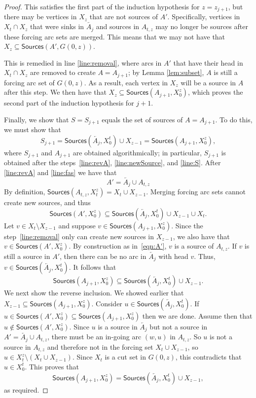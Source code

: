 \documentclass[12pt]{amsart}
\theoremstyle{plain}
\theoremstyle{definition}
\renewcommand{\subset}{\subseteq}
\newcommand{\rev}[1]{\overleftarrow{#1}}
\newcommand{\sources}{\mathsf{Sources}}
\newcommand{\fas}{\mathsf{FAS}}
\begin{document}
\begin{proof}
This satisfies the first part of the induction hypothesis for $z=z_{j+1}$, but there may be vertices in $X_{z}$ that are not sources of $A'$. Specifically, vertices in $X_t\cap X_z$ that were sinks in $\overleftarrow{A_j}$ and sources in $A_{t,z}$ may no longer be sources after these forcing arc sets are merged. This means that we may not have that $X_z\subset \sources(A', G(0,z))$.

This is remedied in line \ref{line:removal}, where arcs in $A'$ that have their head in $X_t\cap X_{z}$ are removed to create $A=A_{j+1}$; by Lemma \ref{lem:subset}, $A$ is still a forcing arc set of $G(0,z)$. As a result, each vertex in $X_{z}$ will be a source in $A$ after this step. We then have that $X_z\subset \sources(A_{j+1},X_0^z)$, which proves the second part of the induction hypothesis for $j+1$.



Finally, we show that $S=S_{j+1}$ equals the set of sources of $A=A_{j+1}$. To do this, we must show that 
$$
S_{j+1} = \sources(\rev{A_j}, X_0^{t})\cup X_{z-1}=\sources(A_{j+1}, X_0^{z}),
$$
where $S_{j+1}$ and $A_{j+1}$ are obtained algorithmically; in particular, $S_{j+1}$ is obtained after the steps~\ref{line:revA}, \ref{line:newSource}, and \ref{line:S}. 
After \ref{line:revA} and \ref{line:fas} we have that 
\begin{equation}\label{eqn:A'}
A' = \rev{A_j}\cup A_{t,z}%
\end{equation}
By definition, $\sources(A_{t,z},X_t^z) =X_t\cup X_{z-1}$.
Merging forcing arc sets cannot create new sources, and thus
$$
\sources(A', X_0^z) \subset \sources(\rev{A_j}, X_0^t)\cup X_{z-1}\cup X_t.
$$
Let $v\in X_t\setminus X_{z-1}$ and suppose $v\in \sources (A_{j+1},X_0^z)$. 
Since the step~\ref{line:removal} only can create new sources in $X_{z-1}$, we also have that $v\in \sources(A',X_0^z)$. 
By construction as in~\eqref{eqn:A'}, $v$ is a source of  $A_{t,z}$. %
If $v$ is still a source in $A'$, then there can be no arc in $\rev{A_j}$ with head $v$. 
Thus, $v\in \sources(\rev{A_j},X_0^t)$. It follows that
$$
\sources(A_{j+1}, X_0^z) \subset \sources(\rev{A_j}, X_0^t)\cup X_{z-1}.
$$
We next show the reverse inclusion. We showed earlier that $X_{z-1}\subseteq \sources(A_{j+1},X_0^z)$. 
Consider $u\in \sources(\rev{A_j},X_0^t)$. 
If $u\in \sources(A',X_0^z)\subset \sources(A_{j+1},X_0^z)$ then we are done.  Assume then that $u\not\in \sources(A',X_0^z)$.
Since $u$ is  a source in $\rev{A_j}$
but not a source in $A'=\rev{A_j}\cup A_{t,z}$, there must be an in-going arc $(w,u)$ in $A_{t,z}$. %
So $u$ is not a source in $A_{t,z}$ and therefore not in the forcing set $X_t\cup X_{z-1}$, so $u\in X_t^z\setminus (X_t\cup X_{z-1})$. Since $X_t$ is a cut set in $G(0,z)$, this contradicts that $u\in X_0^t$. 
This proves that 
$$
\sources(A_{j+1}, X_0^z) = \sources(\rev{A_j}, X_0^t)\cup X_{z-1},
$$
as required. 


\end{proof}
\end{document}

